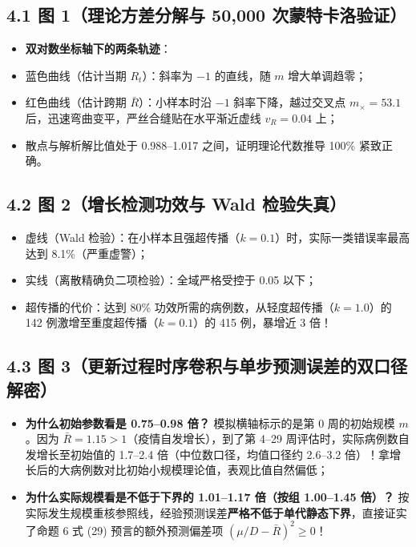 \documentclass[11pt,a4paper]{ctexart}
\begin{document}
\subsection{4.1 图 1（理论方差分解与 50,000 次蒙特卡洛验证）}
\begin{itemize}[leftmargin=2em, itemsep=2pt, parsep=0pt]
\item \textbf{双对数坐标轴下的两条轨迹}：
\item 蓝色曲线（估计当期 $R_t$）：斜率为 $-1$ 的直线，随 $m$ 增大单调趋零；
\item 红色曲线（估计跨期 $\bar{R}$）：小样本时沿 $-1$ 斜率下降，越过交叉点 $m_\times = 53.1$ 后，迅速弯曲变平，严丝合缝贴在水平渐近虚线 $v_R = 0.04$ 上；
\item 散点与解析解比值处于 0.988–1.017 之间，证明理论代数推导 100\% 紧致正确。
\end{itemize}

\subsection{4.2 图 2（增长检测功效与 Wald 检验失真）}
\begin{itemize}[leftmargin=2em, itemsep=2pt, parsep=0pt]
\item 虚线（Wald 检验）：在小样本且强超传播（$k=0.1$）时，实际一类错误率最高达到 8.1\%（严重虚警）；
\item 实线（离散精确负二项检验）：全域严格受控于 0.05 以下；
\item 超传播的代价：达到 80\% 功效所需的病例数，从轻度超传播（$k=1.0$）的 142 例激增至重度超传播（$k=0.1$）的 415 例，暴增近 3 倍！
\end{itemize}

\subsection{4.3 图 3（更新过程时序卷积与单步预测误差的双口径解密）}
\begin{itemize}[leftmargin=2em, itemsep=2pt, parsep=0pt]
\item \textbf{为什么初始参数看是 0.75–0.98 倍？} 模拟横轴标示的是第 0 周的初始规模 $m$。因为 $\bar{R} = 1.15 > 1$（疫情自发增长），到了第 4–29 周评估时，实际病例数自发增长至初始值的 1.7–2.4 倍（中位数口径，均值口径约 2.6–3.2 倍）！拿增长后的大病例数对比初始小规模理论值，表观比值自然偏低；
\item \textbf{为什么实际规模看是不低于下界的 1.01–1.17 倍（按组 1.00–1.45 倍）？} 按实际发生规模重核参照线，经验预测误差\textbf{严格不低于单代静态下界}，直接证实了命题 6 式 (29) 预言的额外预测偏差项 $(\mu/D - \bar{R})^2 \ge 0$！
\end{itemize}
\end{document}
